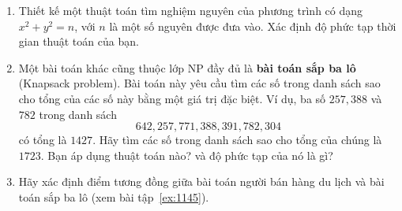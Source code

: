 \begin{multicols}{2}
\begin{enumerate}
  \item Thiết kế một thuật toán tìm nghiệm nguyên của phương trình có dạng $x^2 + y^2 =
    n$, với $n$ là một số nguyên được đưa vào. Xác định độ phức tạp thời gian thuật toán
    của bạn.

  \item \label{ex:1145} Một bài toán khác cũng thuộc lớp NP đầy đủ là \textbf{bài toán
      sắp ba lô} (Knapsack problem). Bài toán này yêu cầu tìm các số trong danh sách sao
    cho tổng của các số này bằng một giá trị đặc biệt. Ví dụ, ba số $257, 388$ và~$782$
    trong danh sách
    \[
    642, 257, 771, 388, 391, 782, 304
    \]
    có tổng là $1427$. Hãy tìm các số trong danh sách sao cho tổng của chúng là
    $1723$. Bạn áp dụng thuật toán nào? và độ phức tạp của nó là gì?

  \item Hãy xác định điểm tương đồng giữa bài toán người bán hàng du lịch và bài toán sắp
    ba lô (xem bài tập~\ref{ex:1145}).
  \end{enumerate}

  
\end{multicols}


